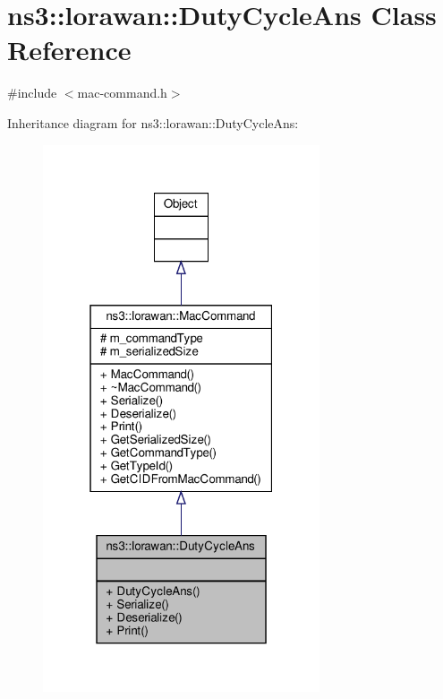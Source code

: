 \hypertarget{classns3_1_1lorawan_1_1DutyCycleAns}{}\section{ns3\+:\+:lorawan\+:\+:Duty\+Cycle\+Ans Class Reference}
\label{classns3_1_1lorawan_1_1DutyCycleAns}


{\ttfamily \#include $<$mac-\/command.\+h$>$}



Inheritance diagram for ns3\+:\+:lorawan\+:\+:Duty\+Cycle\+Ans\+:
\nopagebreak
\begin{figure}[H]
\begin{center}
\leavevmode
\includegraphics[width=232pt]{classns3_1_1lorawan_1_1DutyCycleAns__inherit__graph}
\end{center}
\end{figure}


